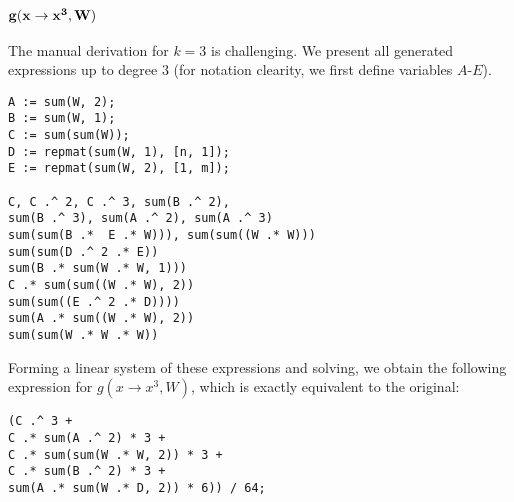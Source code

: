 \subsubsection{{$\bf g(x \rightarrow x^3, W)$}}
The manual derivation for $k = 3$ is challenging. We present all generated expressions up to degree 
$3$ (for notation clearity, we first define variables $A$-$E$).
\vspace{-0.4cm}
\begin{lstlisting}
A := sum(W, 2);
B := sum(W, 1);
C := sum(sum(W));
D := repmat(sum(W, 1), [n, 1]);
E := repmat(sum(W, 2), [1, m]);

C, C .^ 2, C .^ 3, sum(B .^ 2), 
sum(B .^ 3), sum(A .^ 2), sum(A .^ 3)
sum(sum(B .*  E .* W))), sum(sum((W .* W)))
sum(sum(D .^ 2 .* E))
sum(B .* sum(W .* W, 1)))
C .* sum(sum((W .* W), 2))
sum(sum((E .^ 2 .* D)))) 
sum(A .* sum((W .* W), 2))
sum(sum(W .* W .* W))
\end{lstlisting}

%
Forming a linear system of these expressions and solving, we obtain
the following expression for $g(x \rightarrow x^3, W)$, which is
exactly equivalent to the original:
\vspace{-0.3cm}
\begin{lstlisting}
(C .^ 3 + 
C .* sum(A .^ 2) * 3 +
C .* sum(sum(W .* W, 2)) * 3 +
C .* sum(B .^ 2) * 3 + 
sum(A .* sum(W .* D, 2)) * 6)) / 64;
\end{lstlisting}

